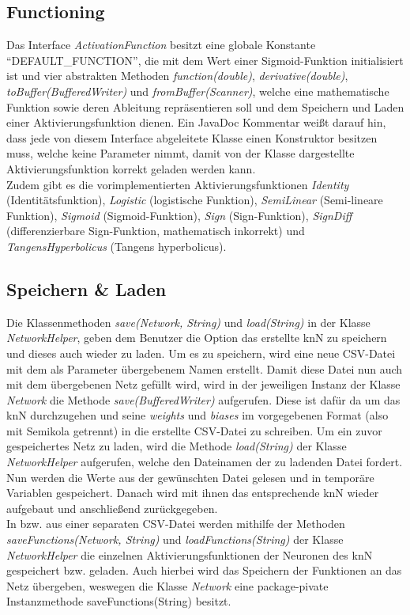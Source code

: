 \documentclass[paper=A4,pagesize=auto,12pt,headinclude=true,footinclude=true,BCOR=0mm,DIV=calc]{scrartcl}
\begin{document}
\hypertarget{functioning}{\subsection{Functioning}}
Das Interface \textit{ActivationFunction} besitzt eine globale Konstante “DEFAULT\_FUNCTION”, die mit dem Wert einer Sigmoid-Funktion initialisiert ist und vier abstrakten Methoden \textit{function(double)}, \textit{derivative(double)}, \textit{toBuffer(BufferedWriter)} und \textit{fromBuffer(Scanner)}, welche eine mathematische Funktion sowie deren Ableitung repräsentieren soll und dem Speichern und Laden einer Aktivierungsfunktion dienen. Ein JavaDoc Kommentar weißt darauf hin, dass jede von diesem Interface abgeleitete Klasse einen Konstruktor besitzen muss, welche keine Parameter nimmt, damit von der Klasse dargestellte Aktivierungsfunktion korrekt geladen werden kann. \\
Zudem gibt es die vorimplementierten Aktivierungsfunktionen \textit{Identity} (Identitätsfunktion), \textit{Logistic} (logistische Funktion), \textit{SemiLinear} (Semi-lineare Funktion), \textit{Sigmoid} (Sigmoid-Funktion), \textit{Sign} (Sign-Funktion), \textit{SignDiff} (differenzierbare Sign-Funktion, mathematisch inkorrekt) und \textit{TangensHyperbolicus} (Tangens hyperbolicus).


\subsection{Speichern \& Laden}
Die Klassenmethoden \textit{save(Network, String)} und \textit{load(String)} in der Klasse \textit{NetworkHelper}, geben dem Benutzer die Option das erstellte knN zu speichern und dieses auch wieder zu laden. Um es zu speichern, wird eine neue CSV-Datei mit dem als Parameter übergebenem Namen erstellt. Damit diese Datei nun auch mit dem übergebenen Netz gefüllt wird, wird in der jeweiligen Instanz der Klasse \textit{Network} die Methode \textit{save(BufferedWriter)} aufgerufen. Diese ist dafür da um das knN durchzugehen und seine \textit{weights} und \textit{biases} im vorgegebenen Format (also mit Semikola getrennt) in die erstellte CSV-Datei zu schreiben. Um ein zuvor gespeichertes Netz zu laden, wird die Methode \textit{load(String)} der Klasse \textit{NetworkHelper} aufgerufen, welche den Dateinamen der zu ladenden Datei fordert. Nun werden die Werte aus der gewünschten Datei gelesen und in temporäre Variablen gespeichert. Danach wird mit ihnen das entsprechende knN wieder aufgebaut und anschließend zurückgegeben.
\\
In bzw. aus einer separaten CSV-Datei werden mithilfe der Methoden \textit{saveFunctions(Network, String)} und \textit{loadFunctions(String)} der Klasse \textit{NetworkHelper} die einzelnen Aktivierungsfunktionen der Neuronen des knN gespeichert bzw. geladen. Auch hierbei wird das Speichern der Funktionen an das Netz übergeben, weswegen die Klasse \textit{Network} eine package-pivate Instanzmethode saveFunctions(String) besitzt.
\end{document}
